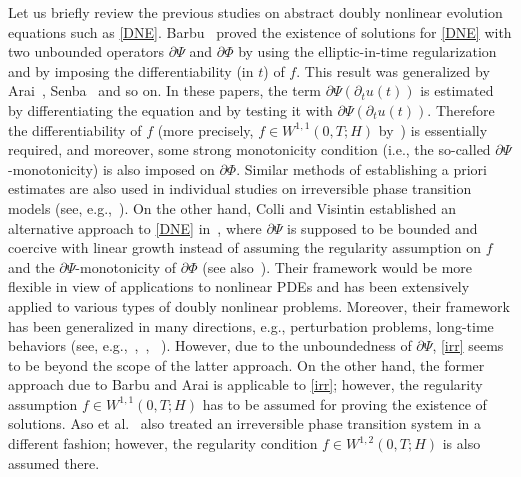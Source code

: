 \documentclass[reqno,10pt]{amsart}
\begin{document}
Let us briefly review the previous studies on abstract doubly nonlinear
evolution equations such as \eqref{DNE}.
Barbu~\cite{Barbu75} proved the existence of solutions for
\eqref{DNE} with two unbounded operators $\partial \Psi$
and $\partial \Phi$ by using the elliptic-in-time regularization and by
imposing the differentiability (in $t$) of $f$. This
result was generalized by Arai~\cite{Arai}, Senba~\cite{Senba} and
so on. In these papers, the term $\partial \Psi (\partial_t u(t))$ is
estimated by differentiating the equation and by testing it with $\partial
\Psi (\partial_t u(t))$. Therefore the differentiability of $f$ (more
precisely, $f \in W^{1,1}(0,T;H)$ by~\cite{Arai}) is essentially required, and
moreover, some strong monotonicity condition (i.e., the so-called
$\partial \Psi $-monotonicity) is also imposed on $\partial
\Phi$. Similar methods of establishing a priori estimates are also used
in individual studies on irreversible phase transition models (see,
e.g.,~\cite{BL06}). On the other hand, Colli and Visintin established an
alternative approach to \eqref{DNE} in~\cite{CV}, where $\partial \Psi$
is supposed to be bounded and coercive with linear growth instead of
assuming the regularity assumption on $f$ and the $\partial \Psi$-monotonicity
of $\partial \Phi$ (see also~\cite{Colli}). Their framework would be
more flexible in view of applications to nonlinear PDEs and has been
extensively applied to various types of doubly nonlinear
problems. Moreover, their framework has been generalized in many
directions, e.g., perturbation problems, long-time behaviors (see,
e.g.,~\cite{AiziYan, MiTh,MiRoSt08},~\cite[Sect.~11]{Roubicek},
~\cite{S08-BE, Segatti, MiRo, SSS, G11, G12, G15, G19}).
However, due to the unboundedness of $\partial \Psi$, \eqref{irr} seems
to be beyond the scope of the latter approach.
On the other hand, the former approach due to Barbu and Arai is
applicable to \eqref{irr}; however, the regularity assumption $f \in
W^{1,1}(0,T;H)$ has to be assumed for proving the existence of
solutions. Aso et al.~\cite{AsFrK, AsK} also treated an irreversible
phase transition system in a different fashion; however, the regularity
condition $f \in W^{1,2}(0,T;H)$ is also assumed there.
\end{document}
